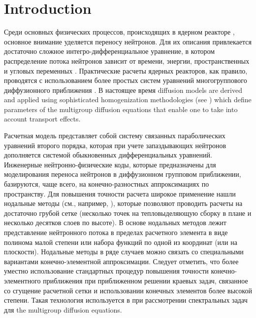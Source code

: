 \documentclass[authoryear]{elsarticle}
\begin{document}
\section{Introduction} 

Среди основных физических процессов, происходящих в ядерном реакторе \citep{duderstadt1976nuclear}, 
основное внимание уделяется переносу нейтронов. 
Для их описания привлекается достаточно сложное интегро-дифференциальное уравнение, 
в котором распределение потока нейтронов зависит от времени, энергии, пространственных 
и угловых переменных \citep{hetrick1971dynamics,stacey}. 
Практические расчеты ядерных реакторов, как правило, проводятся с использованием 
более простых систем уравнений многогруппового диффузионного приближения \citep{marchuk1986numerical,lewis1993computational,sutton1996diffusion,cho2005fundamentals}.
В настоящее время diffusion models are derived 
and applied using sophisticated homogenization methodologies (see \cite{sanchez2009assembly,dugan2016cross}) 
which define parameters of the multigroup diffusion equations that enable one to take into account transport effects. 

Расчетная модель представляет собой систему связанных параболических уравнений второго порядка, которая
при учете запаздывающих нейтронов дополняется системой обыкновенных дифференциальных уравнений.
Инженерные нейтронно-физические коды, которые предназначены для моделирования переноса нейтронов в диффузионном групповом приближении,
базируются, чаще всего, на конечно-разностных аппроксимациях по пространству. 
Для повышения точности расчета широкое применение нашли нодальные методы 
(см., например, \cite{smith1979analytic,lawrence1986progress}), 
которые позволяют проводить расчеты на достаточно грубой сетке (несколько точек на тепловыделяющую сборку в плане и несколько десятков слоев по высоте). В основе нодальных методов лежит представление нейтронного потока в пределах расчетного элемента в виде полинома малой степени или набора функций по одной из координат (или на плоскости). 
Нодальные методы в ряде случаев можно связать \citep{grossman2007nodal} со специальными вариантами конечно-элементной аппроксимации.
Следует отметить, что более уместно использование стандартных процедур повышения точности конечно-элементного приближения при приближенном
решении краевых задач, связанное со сгущение расчетной сетки и использовании конечных элементов более высокой степени.
Такая технология используется в \cite{vidal2014solution,avvakumov2017spectral} 
при рассмотрении спектральных задач для the multigroup diffusion equations.
\end{document}
